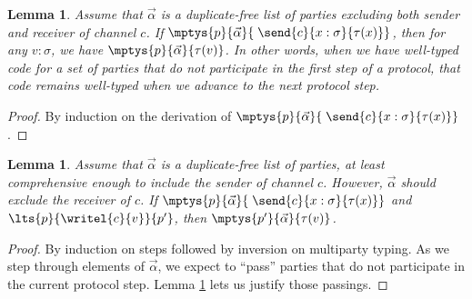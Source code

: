\documentclass{amsbook}
\newtheorem{lemma}[theorem]{Lemma}
\theoremstyle{definition}
\theoremstyle{remark}
\numberwithin{section}{chapter}
\numberwithin{equation}{chapter}
\begin{document}
\begin{lemma}\label{preserve_unused}
  Assume that $\vec{\alpha}$ is a duplicate-free list of parties excluding both sender and receiver of channel $c$.
  If $\mptys{p}{\vec{\alpha}}{\; \send{c}{x : \sigma}{\tau(x)}}$, then for any $v : \sigma$, we have $\mptys{p}{\vec{\alpha}}{\tau(v)}$.
  In other words, when we have well-typed code for a set of parties that do not participate in the first step of a protocol, that code remains well-typed when we advance to the next protocol step.
\end{lemma}
\begin{proof}
  By induction on the derivation of $\mptys{p}{\vec{\alpha}}{\; \send{c}{x : \sigma}{\tau(x)}}$.
\end{proof}

\begin{lemma}\label{find_sender}
  Assume that $\vec{\alpha}$ is a duplicate-free list of parties, at least comprehensive enough to include the sender of channel $c$.
  However, $\vec{\alpha}$ should \emph{exclude} the receiver of $c$.
  If $\mptys{p}{\vec{\alpha}}{\; \send{c}{x : \sigma}{\tau(x)}}$ and $\lts{p}{\writel{c}{v}}{p'}$, then $\mptys{p'}{\vec{\alpha}}{\tau(v)}$.
\end{lemma}
\begin{proof}
  By induction on steps followed by inversion on multiparty typing.
  As we step through elements of $\vec{\alpha}$, we expect to ``pass'' parties that do not participate in the current protocol step.
  Lemma \ref{preserve_unused} lets us justify those passings.
\end{proof}
\end{document}

